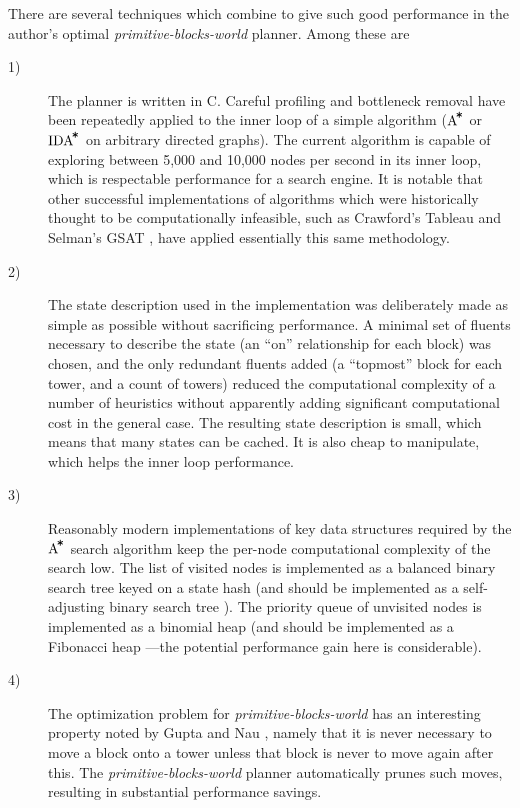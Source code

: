 \documentclass{article}
\newcommand{\sbw}{{\em primitive-blocks-world}}
\newcommand{\astar}{{$\mbox{A}^{\!\mbox{\tt *}}$}}
\newcommand{\idastar}{{$\mbox{IDA}^{\!\mbox{\tt *}}$}}
\begin{document}
There are several techniques which combine to give such good
performance in the author's optimal \sbw{} planner.  Among these
are
\begin{description}
\item[1)]
The planner is written in {\sc C}.  Careful profiling and
bottleneck removal have been repeatedly applied to the inner loop
of a simple algorithm (\astar{} or \idastar{} \cite{ginsberg-astar}
on arbitrary directed graphs).
The current algorithm is capable of exploring
between 5,000 and 10,000 nodes per second in its inner loop,
which is respectable performance for a search engine.
It is notable that other successful implementations of algorithms which
were historically thought to be computationally infeasible, such
as Crawford's {\sc Tableau} \cite{tableaux} and
Selman's {\sc GSAT} \cite{GSAT}, have
applied essentially this same methodology.

\item[2)]
The state description used in the implementation was 
deliberately made as simple as possible without sacrificing
performance.  A minimal set of fluents necessary to describe
the state (an ``on'' relationship for each block)
was chosen, and the only redundant fluents added (a ``topmost'' block
for each tower, and a count of towers) reduced the computational
complexity of a number of heuristics without apparently adding
significant computational cost in the general case.  The resulting
state description is small, which means that many states can be cached.
It is also cheap to manipulate, which helps the inner loop performance.

\item[3)]
Reasonably modern implementations of key data structures
required by the \astar{} search algorithm keep
the per-node computational complexity of the search low.
The list of visited nodes 
is implemented as a balanced binary search tree keyed
on a state hash (and should be implemented
as a self-adjusting binary search tree \cite{tarjan-sabst}).
The priority queue of unvisited nodes is implemented as
a binomial heap \cite{cormen-heaps}
(and should be implemented as a Fibonacci
heap \cite{cormen-heaps}---the
potential performance gain here is considerable).

\item[4)]
The optimization problem for \sbw{} has an interesting property
noted by Gupta and Nau \cite{gupta-nau}, namely that it is never
necessary to move a block onto a tower unless that block is never
to move again after this.  The \sbw{} planner automatically prunes
such moves, resulting in substantial performance savings.


\end{description}
\end{document}
